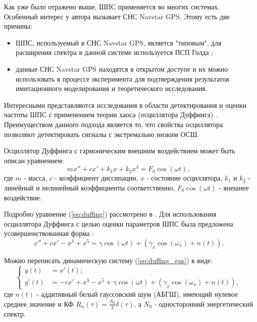 Как уже было отражено выше, ШПС применяется во многих системах. Особенный интерес у автора вызывает СНС Navstar GPS. Этому есть две причины:
\begin{itemize}
	\item ШПС, используемый в СНС Navstar GPS, является "типовым", для расширения спектра в данной системе используется ПСП Голда \cite{gold-ieee};
	\item данные СНС Navstar GPS находятся в открытом доступе и их можно использовать в процессе эксперимента для подтверждения результатов имитационного
		моделирования и теоретического исследования.
\end{itemize}

Интересными представляются исследования в области детектирования и оценки
частоты ШПС с применением теории хаоса (осциллятора Дуффинга) \cite{chaos_cambridge, chaos_chen, chaos_huang, chaos_wang}. Преимуществом
данного подхода является то, что свойства осциллятора позволяют детектировать сигналы с экстремально низким ОСШ.

Осциллятор Дуффинга с гармоническим внешним воздействием может быть описан уравнением:
\begin{equation}
	\label{eq:duffing}
	mx'' + cx' + k_{1}x + k_{2}x^3 = F_{0}\cos(\omega{t}),
\end{equation}
где $m$ - масса, $c$ - коэффициент диссипации, $x$ - состояние осциллятора, $k_1$ и $k_2$ - линейный и нелинейный коэффициенты соответственно,
$F_{0}\cos(\omega{t})$ - внешнее воздействие.

Подробно уравнение (\ref{eq:duffing}) рассмотрено в \cite{chaos_neimark_landa}.
Для использования осциллятора Дуффинга с целью оценки параметров ШПС была предложена усовершенствованная форма \cite{chaos_song, chaos_chen}:
\begin{equation}
	\label{eq:duffing_gps}
	x'' +cx' - x^3 + x^5 = \gamma\cos(\omega{t}) + (\gamma_{x}\cos(\omega_{x}) + n(t)).
\end{equation}

Можно переписать динамическую систему (\ref{eq:duffing_gps}) в виде:
\begin{equation}
	\label{eq:duffing_gps_2}
	\left\{
	\begin{aligned}
		y(t) & = x'(t); \\
		y'(t) & =  -cx' + x^3 - x^5 + \gamma\cos(\omega{t}) + (\gamma_{x}\cos(\omega_{x}) + n(t)),
	\end{aligned}
	\right.
\end{equation}
где ${n(t)}$ - аддитивный белый гауссовский шум (АБГШ), имеющий нулевое среднее  значение и КФ ${R_n(\tau) = \frac{N_0}{2} \delta(\tau)}$,
а ${N_0}$ - односторонний энергетический спектр.

